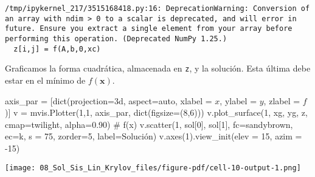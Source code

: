 \documentclass[
  letterpaper,
  DIV=11,
  numbers=noendperiod]{scrreprt}
\newenvironment{Shaded}{\begin{snugshade}}{\end{snugshade}}
\newcommand{\BuiltInTok}[1]{\textcolor[rgb]{0.00,0.23,0.31}{#1}}
\newcommand{\CommentTok}[1]{\textcolor[rgb]{0.37,0.37,0.37}{#1}}
\newcommand{\DecValTok}[1]{\textcolor[rgb]{0.68,0.00,0.00}{#1}}
\newcommand{\FloatTok}[1]{\textcolor[rgb]{0.68,0.00,0.00}{#1}}
\newcommand{\NormalTok}[1]{\textcolor[rgb]{0.00,0.23,0.31}{#1}}
\newcommand{\OperatorTok}[1]{\textcolor[rgb]{0.37,0.37,0.37}{#1}}
\newcommand{\StringTok}[1]{\textcolor[rgb]{0.13,0.47,0.30}{#1}}
\begin{document}
\begin{verbatim}
/tmp/ipykernel_217/3515168418.py:16: DeprecationWarning: Conversion of an array with ndim > 0 to a scalar is deprecated, and will error in future. Ensure you extract a single element from your array before performing this operation. (Deprecated NumPy 1.25.)
  z[i,j] = f(A,b,0,xc)
\end{verbatim}

Graficamos la forma cuadrática, almacenada en \texttt{z}, y la solución.
Esta última debe estar en el mínimo de \(f(\mathbf{x})\).

\begin{Shaded}
\begin{Highlighting}[]
\NormalTok{axis\_par }\OperatorTok{=}\NormalTok{ [}\BuiltInTok{dict}\NormalTok{(projection}\OperatorTok{=}\StringTok{\textquotesingle{}3d\textquotesingle{}}\NormalTok{, aspect}\OperatorTok{=}\StringTok{\textquotesingle{}auto\textquotesingle{}}\NormalTok{, xlabel }\OperatorTok{=} \StringTok{\textquotesingle{}$x$\textquotesingle{}}\NormalTok{, ylabel }\OperatorTok{=} \StringTok{\textquotesingle{}$y$\textquotesingle{}}\NormalTok{, zlabel }\OperatorTok{=} \StringTok{\textquotesingle{}$f$\textquotesingle{}}\NormalTok{)]}
\NormalTok{v }\OperatorTok{=}\NormalTok{ mvis.Plotter(}\DecValTok{1}\NormalTok{,}\DecValTok{1}\NormalTok{, axis\_par, }\BuiltInTok{dict}\NormalTok{(figsize}\OperatorTok{=}\NormalTok{(}\DecValTok{8}\NormalTok{,}\DecValTok{6}\NormalTok{)))}
\NormalTok{v.plot\_surface(}\DecValTok{1}\NormalTok{, xg, yg, z, cmap}\OperatorTok{=}\StringTok{\textquotesingle{}twilight\textquotesingle{}}\NormalTok{, alpha}\OperatorTok{=}\FloatTok{0.90}\NormalTok{) }\CommentTok{\# f(x)}
\NormalTok{v.scatter(}\DecValTok{1}\NormalTok{, sol[}\DecValTok{0}\NormalTok{], sol[}\DecValTok{1}\NormalTok{], fc}\OperatorTok{=}\StringTok{\textquotesingle{}sandybrown\textquotesingle{}}\NormalTok{, ec}\OperatorTok{=}\StringTok{\textquotesingle{}k\textquotesingle{}}\NormalTok{, s }\OperatorTok{=} \DecValTok{75}\NormalTok{, zorder}\OperatorTok{=}\DecValTok{5}\NormalTok{, label}\OperatorTok{=}\StringTok{\textquotesingle{}Solución\textquotesingle{}}\NormalTok{)}
\NormalTok{v.axes(}\DecValTok{1}\NormalTok{).view\_init(elev }\OperatorTok{=} \DecValTok{15}\NormalTok{, azim }\OperatorTok{=} \OperatorTok{{-}}\DecValTok{15}\NormalTok{)}
\end{Highlighting}
\end{Shaded}

\texttt{[image: 08\_Sol\_Sis\_Lin\_Krylov\_files/figure-pdf/cell-10-output-1.png]}
\end{document}
